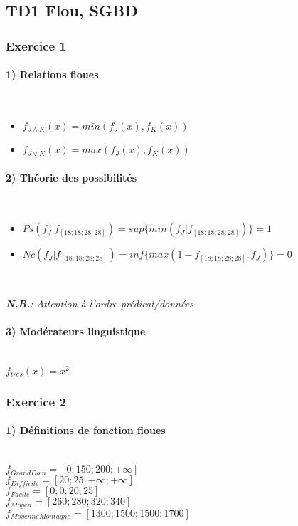 \documentclass[a4paper,11pt]{article}
\begin{document}
\subsection{TD1 Flou, SGBD}
\subsubsection{Exercice 1}
\paragraph{1) Relations floues} ~\\
	\begin{itemize}
	\item $f_{J\land K}(x)=min(f_J(x),f_K(x))$
	\item $f_{J\lor K}(x)=max(f_J(x),f_K(x))$
	\end{itemize}

\paragraph{2) Théorie des possibilités} ~\\
\begin{itemize}
\item $Ps(f_J|f_{[18;18;28;28]})=sup\{min(f_J|f_{[18;18;28;28]})\}=1$
\item $Nc(f_J|f_{[18;18;28;28]})=inf\{max(1-f_{[18;18;28;28]},f_J)\}=0$
\end{itemize}
~

\emph{\textbf{N.B.}: Attention à l'ordre prédicat/données}\\

\paragraph{3) Modérateurs linguistique} ~\\

$f_{tres}(x)=x^2 $

\subsubsection{Exercice 2}

\paragraph{1) Définitions de fonction floues} ~\\

\noindent $f_{GrandDom}=[0;150;200;+\infty]$\\
$f_{Difficile}=[20;25;+\infty;+\infty]$\\
$f_{Facile}=[0;0;20;25]$\\
$f_{Moyen}=[260;280;320;340]$\\
$f_{MoyenneMontagne}=[1300;1500;1500;1700]$\\
\end{document}
